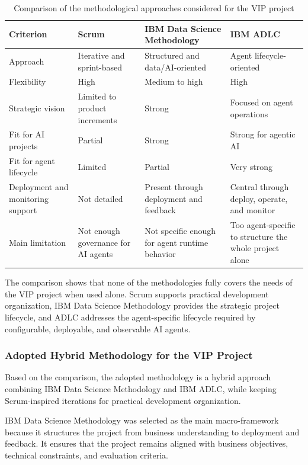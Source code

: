 \begin{table}[H]
\centering
\scriptsize
\renewcommand{\arraystretch}{1.3}
\begin{tabularx}{\textwidth}{|p{2.9cm}|X|X|X|}
\hline
\rowcolor{gray!20}
\textbf{Criterion} & \textbf{Scrum} & \textbf{IBM Data Science Methodology} & \textbf{IBM ADLC} \\
\hline
Approach & Iterative and sprint-based & Structured and data/AI-oriented & Agent lifecycle-oriented \\
\hline
Flexibility & High & Medium to high & High \\
\hline
Strategic vision & Limited to product increments & Strong & Focused on agent operations \\
\hline
Fit for AI projects & Partial & Strong & Strong for agentic AI \\
\hline
Fit for agent lifecycle & Limited & Partial & Very strong \\
\hline
Deployment and monitoring support & Not detailed & Present through deployment and feedback & Central through deploy, operate, and monitor \\
\hline
Main limitation & Not enough governance for AI agents & Not specific enough for agent runtime behavior & Too agent-specific to structure the whole project alone \\
\hline
\end{tabularx}
\caption{Comparison of the methodological approaches considered for the VIP project}
\label{tab:methodology_comparison_vip}
\end{table}

The comparison shows that none of the methodologies fully covers the needs of the VIP project when used alone. Scrum supports practical development organization, IBM Data Science Methodology provides the strategic project lifecycle, and ADLC addresses the agent-specific lifecycle required by configurable, deployable, and observable AI agents.

\subsubsection{Adopted Hybrid Methodology for the VIP Project}

Based on the comparison, the adopted methodology is a hybrid approach combining IBM Data Science Methodology and IBM ADLC, while keeping Scrum-inspired iterations for practical development organization.

IBM Data Science Methodology was selected as the main macro-framework because it structures the project from business understanding to deployment and feedback. It ensures that the project remains aligned with business objectives, technical constraints, and evaluation criteria.

